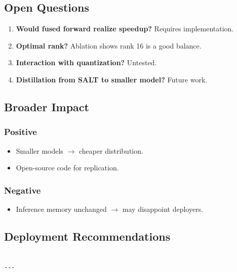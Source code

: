 \subsection{Open Questions}

\begin{enumerate}
\item \textbf{Would fused forward realize speedup?} Requires implementation.
\item \textbf{Optimal rank?} Ablation shows rank 16 is a good balance.
\item \textbf{Interaction with quantization?} Untested.
\item \textbf{Distillation from SALT to smaller model?} Future work.

\end{enumerate}
\subsection{Broader Impact}

\subsubsection{Positive}

\begin{itemize}
\item Smaller models $\to$ cheaper distribution.
\item Open-source code for replication.

\end{itemize}
\subsubsection{Negative}

\begin{itemize}
\item Inference memory unchanged $\to$ may disappoint deployers.

\end{itemize}
\subsection{Deployment Recommendations}

\begin{lstlisting}

---
\end{lstlisting}